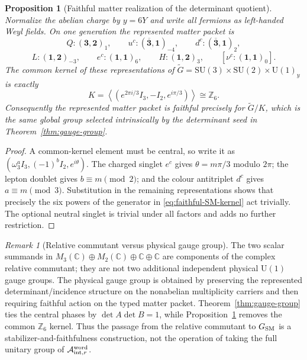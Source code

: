 \documentclass[11pt]{article}
\newtheorem{proposition}[theorem]{Proposition}
\theoremstyle{definition}
\theoremstyle{remark}
\newtheorem{remark}[theorem]{Remark}
\newcommand{\Z}{\mathbb Z}
\newcommand{\C}{\mathbb C}
\newcommand{\U}{\mathrm U}
\newcommand{\SU}{\mathrm{SU}}
\newcommand{\A}{\mathcal A}
\begin{document}
\begin{proposition}[Faithful matter realization of the determinant quotient]
\label{prop:faithful-SM-quotient}
Normalize the abelian charge by $y=6Y$ and write all fermions as left-handed
Weyl fields.  On one generation the represented matter packet is
\[
Q:(\mathbf3,\mathbf2)_1,
\qquad
u^c:(\overline{\mathbf3},\mathbf1)_{-4},
\qquad
d^c:(\overline{\mathbf3},\mathbf1)_2,
\]
\[
L:(\mathbf1,\mathbf2)_{-3},
\qquad
e^c:(\mathbf1,\mathbf1)_6,
\qquad
H:(\mathbf1,\mathbf2)_3,
\qquad
[\nu^c:(\mathbf1,\mathbf1)_0].
\]
The common kernel of these representations of
$\widetilde G=\SU(3)\times\SU(2)\times\U(1)_y$ is exactly
\begin{equation}
\boxed{
K
=
\left\langle
\left(e^{2\pi i/3}I_3,-I_2,e^{i\pi/3}\right)
\right\rangle
\cong\Z_6.}
\label{eq:faithful-SM-kernel}
\end{equation}
Consequently the represented matter packet is faithful precisely for
$\widetilde G/K$, which is the same global group selected intrinsically by the
determinant seed in Theorem~\ref{thm:gauge-group}.
\end{proposition}

\begin{proof}
A common-kernel element must be central, so write it as
$(\omega_3^aI_3,(-1)^bI_2,e^{i\theta})$.  The charged singlet $e^c$ gives
$\theta=m\pi/3$ modulo $2\pi$; the lepton doublet gives
$b\equiv m\pmod2$; and the colour antitriplet $d^c$ gives
$a\equiv m\pmod3$.  Substitution in the remaining representations shows that
precisely the six powers of the generator in
\eqref{eq:faithful-SM-kernel} act trivially.  The optional neutral singlet is
trivial under all factors and adds no further restriction.
\end{proof}

\begin{remark}[Relative commutant versus physical gauge group]
The two scalar summands in
$M_3(\C)\oplus M_2(\C)\oplus\C\oplus\C$ are components of the complex
relative commutant; they are not two additional independent physical
$\U(1)$ gauge groups.  The physical gauge group is obtained by preserving the
represented determinant/incidence structure on the nonabelian multiplicity
carriers and then requiring faithful action on the typed matter packet.
Theorem~\ref{thm:gauge-group} ties the central phases by
$\det A\det B=1$, while Proposition~\ref{prop:faithful-SM-quotient} removes the
common $\Z_6$ kernel.  Thus the passage from the relative commutant to
$G_{\rm SM}$ is a stabilizer-and-faithfulness construction, not the operation
of taking the full unitary group of
$\A_{{\rm int},r}^{\rm word}$.
\end{remark}
\end{document}
